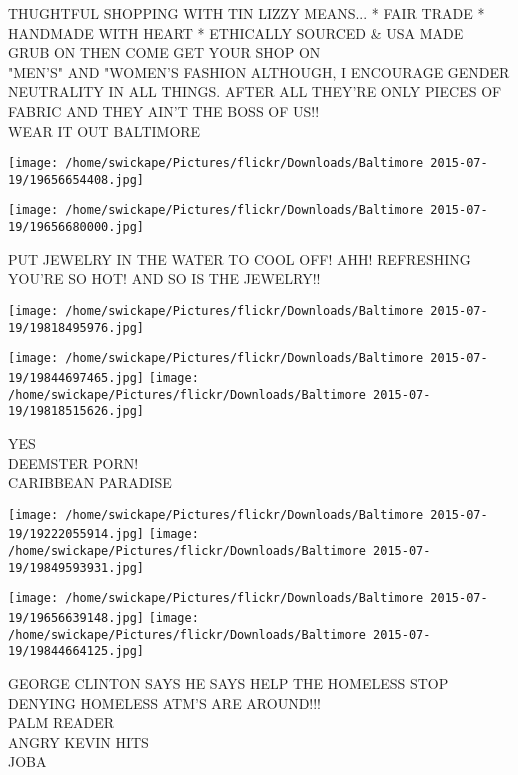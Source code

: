 \documentclass[10pt,letterpaper]{article}
\begin{document}
THUGHTFUL SHOPPING WITH TIN LIZZY MEANS... * FAIR TRADE * HANDMADE WITH HEART * ETHICALLY SOURCED \& USA MADE\\
GRUB ON THEN COME GET YOUR SHOP ON\\
"MEN'S" AND "WOMEN'S  FASHION ALTHOUGH, I ENCOURAGE GENDER NEUTRALITY IN ALL THINGS.  AFTER ALL THEY'RE ONLY PIECES OF FABRIC AND THEY AIN'T THE BOSS OF US!!\\
WEAR IT OUT BALTIMORE\\
\pagebreak

\texttt{[image: /home/swickape/Pictures/flickr/Downloads/Baltimore 2015-07-19/19656654408.jpg]}

\vspace{0.25in}
\texttt{[image: /home/swickape/Pictures/flickr/Downloads/Baltimore 2015-07-19/19656680000.jpg]}

PUT JEWELRY IN THE WATER TO COOL OFF!  AHH!  REFRESHING\\
YOU'RE SO HOT!  AND SO IS THE JEWELRY!!\\
\pagebreak

\texttt{[image: /home/swickape/Pictures/flickr/Downloads/Baltimore 2015-07-19/19818495976.jpg]}

\vspace{0.25in}
\texttt{[image: /home/swickape/Pictures/flickr/Downloads/Baltimore 2015-07-19/19844697465.jpg]}
\texttt{[image: /home/swickape/Pictures/flickr/Downloads/Baltimore 2015-07-19/19818515626.jpg]}

YES\\
DEEMSTER PORN!\\
CARIBBEAN PARADISE\\
\pagebreak

\texttt{[image: /home/swickape/Pictures/flickr/Downloads/Baltimore 2015-07-19/19222055914.jpg]}
\texttt{[image: /home/swickape/Pictures/flickr/Downloads/Baltimore 2015-07-19/19849593931.jpg]}

\texttt{[image: /home/swickape/Pictures/flickr/Downloads/Baltimore 2015-07-19/19656639148.jpg]}
\texttt{[image: /home/swickape/Pictures/flickr/Downloads/Baltimore 2015-07-19/19844664125.jpg]}

GEORGE CLINTON SAYS HE SAYS HELP THE HOMELESS STOP DENYING HOMELESS ATM'S ARE AROUND!!!\\
PALM READER\\
ANGRY KEVIN HITS\\
JOBA\\
\pagebreak
\end{document}
